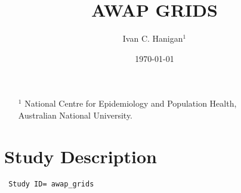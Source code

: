 \documentclass[a4paper]{article}
\begin{document}
\title{AWAP GRIDS} 
\author{Ivan C. Hanigan$^{1}$}
\date{\today}                 
\maketitle
\begin{itemize}
\item [$^1$] National Centre for Epidemiology and Population Health, \\Australian National University.
\end{itemize}

\setcounter{page}{1}
\tableofcontents 
{}
\setcounter{page}{1}

\section{Study Description}

\begin{verbatim}
 Study ID= awap_grids
\end{verbatim}

 
\end{document}
